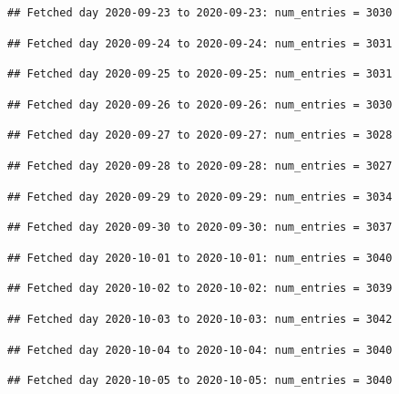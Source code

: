 \documentclass[]{article}
\begin{document}
\begin{verbatim}
## Fetched day 2020-09-23 to 2020-09-23: num_entries = 3030
\end{verbatim}

\begin{verbatim}
## Fetched day 2020-09-24 to 2020-09-24: num_entries = 3031
\end{verbatim}

\begin{verbatim}
## Fetched day 2020-09-25 to 2020-09-25: num_entries = 3031
\end{verbatim}

\begin{verbatim}
## Fetched day 2020-09-26 to 2020-09-26: num_entries = 3030
\end{verbatim}

\begin{verbatim}
## Fetched day 2020-09-27 to 2020-09-27: num_entries = 3028
\end{verbatim}

\begin{verbatim}
## Fetched day 2020-09-28 to 2020-09-28: num_entries = 3027
\end{verbatim}

\begin{verbatim}
## Fetched day 2020-09-29 to 2020-09-29: num_entries = 3034
\end{verbatim}

\begin{verbatim}
## Fetched day 2020-09-30 to 2020-09-30: num_entries = 3037
\end{verbatim}

\begin{verbatim}
## Fetched day 2020-10-01 to 2020-10-01: num_entries = 3040
\end{verbatim}

\begin{verbatim}
## Fetched day 2020-10-02 to 2020-10-02: num_entries = 3039
\end{verbatim}

\begin{verbatim}
## Fetched day 2020-10-03 to 2020-10-03: num_entries = 3042
\end{verbatim}

\begin{verbatim}
## Fetched day 2020-10-04 to 2020-10-04: num_entries = 3040
\end{verbatim}

\begin{verbatim}
## Fetched day 2020-10-05 to 2020-10-05: num_entries = 3040
\end{verbatim}
\end{document}
